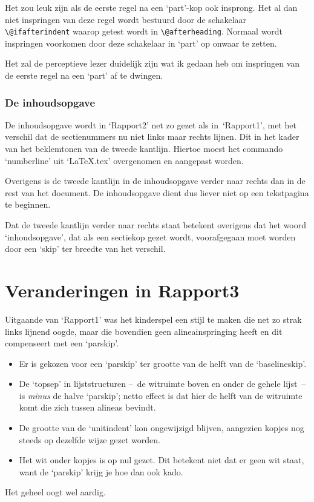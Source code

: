 \documentclass[oldtoc,a4paper,10pt]{rapport3}
\begin{document}
Het zou leuk zijn als de eerste regel na een `part'-kop ook insprong.
Het al dan niet inspringen van deze regel wordt bestuurd door de
schakelaar \verb.\@ifafterindent.  waarop getest wordt in
\verb.\@afterheading..  Normaal wordt inspringen voorkomen door deze
schakelaar in `part' op onwaar te zetten.
 
Het zal de perceptieve lezer duidelijk zijn wat ik gedaan heb om
inspringen van de eerste regel na een `part' af te dwingen.
 
\section{De inhoudsopgave}
 
De inhoudsopgave wordt in `Rapport2' net zo gezet als in~`Rapport1',
met het verschil dat de sectienummers nu niet links maar rechts
lijnen. Dit in het kader van het beklemtonen van de tweede kantlijn.
Hiertoe moest het commando `numberline' uit `LaTeX.tex' overgenomen en
aangepast worden.
 
Overigens is de tweede kantlijn in de inhoudsopgave verder naar rechts
dan in de rest van het document. De inhoudsopgave dient dus liever
niet op een tekstpagina te beginnen.
 
Dat de tweede kantlijn verder naar rechts staat betekent overigens dat
het woord `inhoudsopgave', dat als een sectiekop gezet wordt,
voorafgegaan moet worden door een `skip' ter breedte van het verschil.
 
 
\part{Veranderingen in Rapport3}
 
Uitgaande van `Rapport1' was het kinderspel een stijl te maken die net
zo strak links lijnend oogde, maar die bovendien geen
alinea\-inspringing heeft en dit compenseert met een `parskip'.
\begin{itemize}
\item Er is gekozen voor een `parskip' ter grootte van de helft van de
  `baselineskip'.
\item De `topsep' in lijststructuren --~de witruimte boven en onder de
  gehele lijst~-- is \emph{minus} de halve `parskip'; netto effect is
  dat hier de helft van de witruimte komt die zich tussen alineas
  bevindt.
\item De grootte van de `unitindent' kon ongewijzigd blijven,
  aangezien kopjes nog steeds op dezelfde wijze gezet worden.
\item Het wit onder kopjes is op nul gezet. Dit betekent niet dat er
  geen wit staat, want de `parskip' krijg je hoe dan ook kado.
\end{itemize}
Het geheel oogt wel aardig.
 
\end{document}
